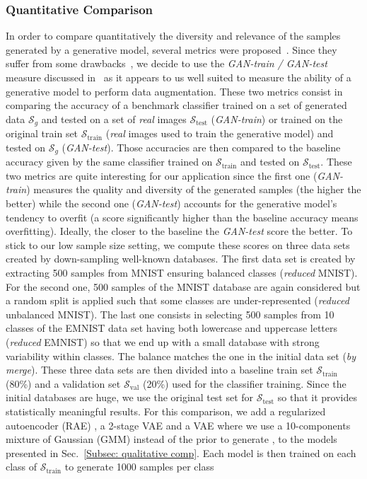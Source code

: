 \documentclass[10pt,journal,compsoc]{IEEEtran}
\begin{document}
        \subsubsection{Quantitative Comparison}\label{Subsec: quantitative comparison}
        In order to compare quantitatively the diversity and relevance of the samples generated by a generative model, several metrics were proposed~\cite{salimans_improved_2016,heusel_gans_2017,karras_progressive_2017, lucic_are_2018}. Since they suffer from some drawbacks~\cite{shmelkov_how_2018,borji_pros_2019}, we decide to use the \emph{GAN-train / GAN-test} measure discussed in~\cite{shmelkov_how_2018} as it appears to us well suited to measure the ability of a generative model to perform data augmentation. These two metrics consist in comparing the accuracy of a benchmark classifier trained on a set of generated data $\mathcal{S}_g$ and tested on a set of \emph{real} images $\mathcal{S}_{\mathrm{test}}$ (\emph{GAN-train}) or trained on the original train set $\mathcal{S}_{\mathrm{train}}$ (\emph{real} images used to train the generative model) and tested on $\mathcal{S}_g$ (\emph{GAN-test}). Those accuracies are then compared to the baseline accuracy given by the same classifier trained on $\mathcal{S}_{\mathrm{train}}$ and tested on $\mathcal{S}_{\mathrm{test}}$. These two metrics are quite interesting for our application since the first one (\emph{GAN-train}) measures the quality and diversity of the generated samples (the higher the better) while the second one (\emph{GAN-test}) accounts for the generative model's tendency to overfit (a score significantly higher than the baseline accuracy means overfitting). Ideally, the closer to the baseline the \emph{GAN-test} score the better. To stick to our low sample size setting, we compute these scores on three data sets created by down-sampling well-known databases. The first data set is created by extracting 500 samples from MNIST ensuring balanced classes (\emph{reduced} MNIST). For the second one, 500 samples of the MNIST database are again considered but a random split is applied such that some classes are under-represented (\emph{reduced} unbalanced MNIST). The last one consists in selecting 500 samples from 10 classes of the EMNIST data set having both lowercase and uppercase letters (\emph{reduced} EMNIST) so that we end up with a small database with strong variability within classes. The balance matches the one in the initial data set (\emph{by merge}). These three data sets are then divided into a baseline train set $\mathcal{S}_{\mathrm{train}}$ (80\%) and a validation set $\mathcal{S}_{\mathrm{val}}$ (20\%) used for the classifier training. Since the initial databases are huge, we use the original test set for $\mathcal{S}_{\mathrm{test}}$ so that it provides statistically meaningful results. For this comparison, we add a regularized autoencoder (RAE) \cite{ghosh_variational_2020}, a 2-stage VAE \cite{dai_diagnosing_2018} and a VAE where we use a 10-components mixture of Gaussian (GMM) instead of the prior to generate \cite{ghosh_variational_2020}, to the models presented in Sec.~\ref{Subsec: qualitative comp}. Each model is then trained on each class of $\mathcal{S}_{\mathrm{train}}$ to generate 1000 samples per class 
\end{document}
